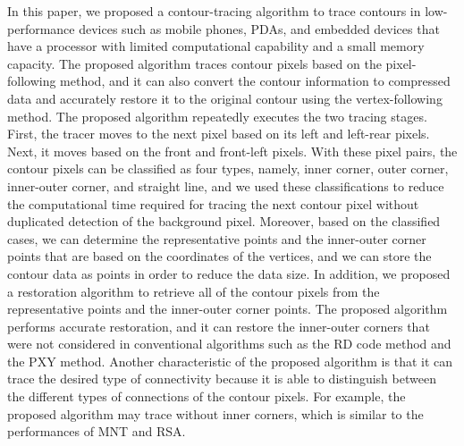In this paper, we proposed a contour-tracing algorithm to trace contours in low-performance devices such as mobile phones, PDAs, and embedded devices that have a processor with limited computational capability and a small memory capacity. The proposed algorithm traces contour pixels based on the pixel-following method, and it can also convert the contour information to compressed data and accurately restore it to the original contour using the vertex-following method. The proposed algorithm repeatedly executes the two tracing stages. First, the tracer moves to the next pixel based on its left and left-rear pixels. Next, it moves based on the front and front-left pixels. With these pixel pairs, the contour pixels can be classified as four types, namely, inner corner, outer corner, inner-outer corner, and straight line, and we used these classifications to reduce the computational time required for tracing the next contour pixel without duplicated detection of the background pixel. Moreover, based on the classified cases, we can determine the representative points and the inner-outer corner points that are based on the coordinates of the vertices, and we can store the contour data as points in order to reduce the data size. In addition, we proposed a restoration algorithm to retrieve all of the contour pixels from the representative points and the inner-outer corner points. The proposed algorithm performs accurate restoration, and it can restore the inner-outer corners that were not considered in conventional algorithms such as the RD code method and the PXY method. Another characteristic of the proposed algorithm is that it can trace the desired type of connectivity because it is able to distinguish between the different types of connections of the contour pixels. For example, the proposed algorithm may trace without inner corners, which is similar to the performances of MNT and RSA.


